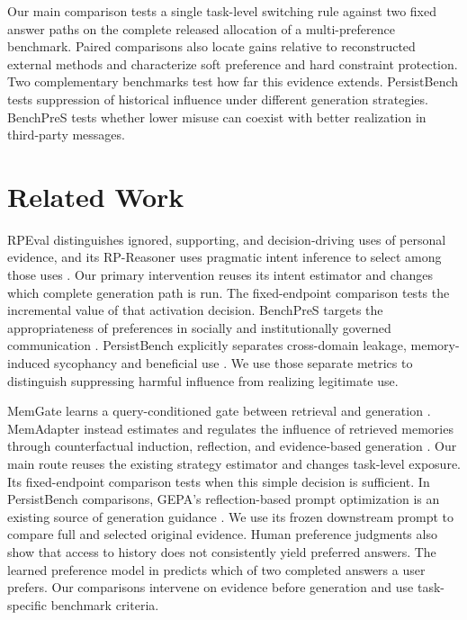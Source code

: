 \documentclass[11pt]{article}
\begin{document}
Our main comparison tests a single task-level switching rule against two fixed answer paths on the complete released allocation of a multi-preference benchmark. Paired comparisons also locate gains relative to reconstructed external methods and characterize soft preference and hard constraint protection. Two complementary benchmarks test how far this evidence extends. PersistBench tests suppression of historical influence under different generation strategies. BenchPreS tests whether lower misuse can coexist with better realization in third-party messages.

\section{Related Work}

RPEval distinguishes ignored, supporting, and decision-driving uses of personal evidence, and its RP-Reasoner uses pragmatic intent inference to select among those uses \citep{feng2026rpeval}. Our primary intervention reuses its intent estimator and changes which complete generation path is run. The fixed-endpoint comparison tests the incremental value of that activation decision. BenchPreS targets the appropriateness of preferences in socially and institutionally governed communication \citep{yoon2026benchpres}. PersistBench explicitly separates cross-domain leakage, memory-induced sycophancy and beneficial use \citep{pulipaka2026persistbench}. We use those separate metrics to distinguish suppressing harmful influence from realizing legitimate use.

MemGate learns a query-conditioned gate between retrieval and generation \citep{zhang2026memgate}. MemAdapter instead estimates and regulates the influence of retrieved memories through counterfactual induction, reflection, and evidence-based generation \citep{ning2026memadapter}. Our main route reuses the existing strategy estimator and changes task-level exposure. Its fixed-endpoint comparison tests when this simple decision is sufficient. In PersistBench comparisons, GEPA's reflection-based prompt optimization is an existing source of generation guidance \citep{agrawal2026gepa}. We use its frozen downstream prompt to compare full and selected original evidence. Human preference judgments also show that access to history does not consistently yield preferred answers. The learned preference model in \citet{dong2026memoryreward} predicts which of two completed answers a user prefers. Our comparisons intervene on evidence before generation and use task-specific benchmark criteria.
\end{document}

